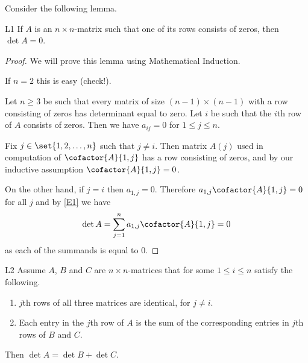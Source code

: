 Consider the following lemma.

\begin{lemma}{}{L1}
  If $A$ is an $n\times n$-matrix such that one of its rows consists
  of zeros, then $\det A=0$.
\end{lemma}

\begin{proof}
  We will prove this lemma using Mathematical Induction.

  If $n=2$ this is easy (check!).

  Let $n\geq 3$ be such that every matrix of size $(n-1)\times(n-1)$
  with a row consisting of zeros has determinant equal to zero.  Let
  $i$ be such that the $i$th row of $A$ consists of zeros.  Then we
  have $a_{ij}=0$ for $1\leq j\leq n$.

  Fix $j\in \set{1,2, \dots ,n}$ such that $j\neq i$. Then matrix
  $A(j)$ used in computation of $\cofactor{A}{1,j}$ has a row consisting of
  zeros, and by our inductive assumption $\cofactor{A}{1,j}=0$.

  On the other hand, if $j=i$ then $a_{1,j}=0$.  Therefore
  $a_{1,j}\cofactor{A}{1,j}=0$ for all $j$ and by \eqref{E1} we have
  \begin{equation*}
    \det A=\sum_{j=1}^n a_{1,j} \cofactor{A}{1,j}=0
  \end{equation*}
  as each of the summands is equal to 0.
\end{proof}

\begin{lemma}{}{L2}
  Assume $A$, $B$ and $C$ are $n\times n$-matrices that for some
  $1\leq i\leq n$ satisfy the following.
  \begin{enumerate}
  \item $j$th rows of all three matrices are identical, for $j\neq i$.

  \item Each entry in the $j$th row of $A$ is the sum of the
    corresponding entries in $j$th rows of $B$ and $C$.
  \end{enumerate}
  Then $\det A=\det B+\det C$.
\end{lemma}


